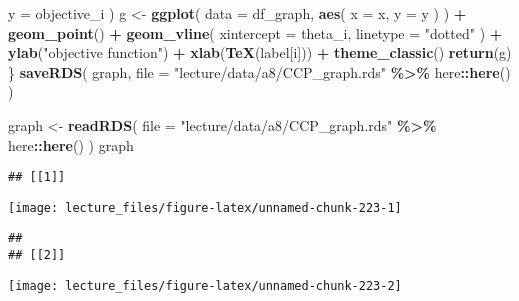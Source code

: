 \documentclass[
]{book}
\newenvironment{Shaded}{\begin{snugshade}}{\end{snugshade}}
\newcommand{\AttributeTok}[1]{\textcolor[rgb]{0.13,0.29,0.53}{#1}}
\newcommand{\FunctionTok}[1]{\textcolor[rgb]{0.13,0.29,0.53}{\textbf{#1}}}
\newcommand{\NormalTok}[1]{#1}
\newcommand{\OtherTok}[1]{\textcolor[rgb]{0.56,0.35,0.01}{#1}}
\newcommand{\SpecialCharTok}[1]{\textcolor[rgb]{0.81,0.36,0.00}{\textbf{#1}}}
\newcommand{\StringTok}[1]{\textcolor[rgb]{0.31,0.60,0.02}{#1}}
\begin{document}
\begin{Shaded}
\begin{Highlighting}[]
      \AttributeTok{y =}\NormalTok{ objective\_i}
\NormalTok{      )}
\NormalTok{  g }\OtherTok{\textless{}{-}} 
    \FunctionTok{ggplot}\NormalTok{(}
      \AttributeTok{data =}\NormalTok{ df\_graph, }
      \FunctionTok{aes}\NormalTok{(}
        \AttributeTok{x =}\NormalTok{ x,}
        \AttributeTok{y =}\NormalTok{ y}
\NormalTok{        )}
\NormalTok{      ) }\SpecialCharTok{+}
    \FunctionTok{geom\_point}\NormalTok{() }\SpecialCharTok{+}
    \FunctionTok{geom\_vline}\NormalTok{(}
      \AttributeTok{xintercept =}\NormalTok{ theta\_i,}
      \AttributeTok{linetype =} \StringTok{"dotted"}
\NormalTok{      ) }\SpecialCharTok{+}
    \FunctionTok{ylab}\NormalTok{(}\StringTok{"objective function"}\NormalTok{) }\SpecialCharTok{+} 
    \FunctionTok{xlab}\NormalTok{(}\FunctionTok{TeX}\NormalTok{(label[i])) }\SpecialCharTok{+} 
  \FunctionTok{theme\_classic}\NormalTok{()}
  \FunctionTok{return}\NormalTok{(g)}
\NormalTok{\}}
\FunctionTok{saveRDS}\NormalTok{(}
\NormalTok{  graph,}
  \AttributeTok{file =} \StringTok{"lecture/data/a8/CCP\_graph.rds"} \SpecialCharTok{\%\textgreater{}\%}\NormalTok{ here}\SpecialCharTok{::}\FunctionTok{here}\NormalTok{()}
\NormalTok{)}
\end{Highlighting}
\end{Shaded}

\begin{Shaded}
\begin{Highlighting}[]
\NormalTok{graph }\OtherTok{\textless{}{-}} 
  \FunctionTok{readRDS}\NormalTok{(}
    \AttributeTok{file =} \StringTok{"lecture/data/a8/CCP\_graph.rds"} \SpecialCharTok{\%\textgreater{}\%}\NormalTok{ here}\SpecialCharTok{::}\FunctionTok{here}\NormalTok{()}
\NormalTok{  )}
\NormalTok{graph}
\end{Highlighting}
\end{Shaded}

\begin{verbatim}
## [[1]]
\end{verbatim}

\begin{center}\texttt{[image: lecture\_files/figure-latex/unnamed-chunk-223-1]} \end{center}

\begin{verbatim}
## 
## [[2]]
\end{verbatim}

\begin{center}\texttt{[image: lecture\_files/figure-latex/unnamed-chunk-223-2]} \end{center}
\end{document}
